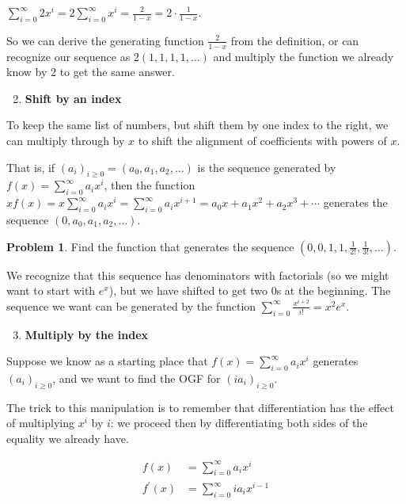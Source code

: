 \documentclass{article}
\theoremstyle{definition}
\newtheorem{problem}{Problem}
\begin{document}
$\sum_{i=0}^{\infty} 2 x^{i}=2 \sum_{i=0}^{\infty} x^{i}=\frac{2}{1-x}=2 \cdot \frac{1}{1-x}$.

So we can derive the generating function $\frac{2}{1-x}$ from the definition, or can recognize our sequence as $2(1,1,1,1, \ldots)$ and multiply the function we already know by 2 to get the same answer.

\begin{enumerate}
\setcounter{enumi}{1}
\item \textbf{Shift by an index}
\end{enumerate}

To keep the same list of numbers, but shift them by one index to the right, we can multiply through by $x$ to shift the alignment of coefficients with powers of $x$.

That is, if $\left(a_{i}\right)_{i \geq 0}=\left(a_{0}, a_{1}, a_{2}, \ldots\right)$ is the sequence generated by $f(x)=\sum_{i=0}^{\infty} a_{i} x^{i}$, then the function $x f(x)=x \sum_{i=0}^{\infty} a_{i} x^{i}=\sum_{i=0}^{\infty} a_{i} x^{i+1}=a_{0} x+a_{1} x^{2}+a_{2} x^{3}+\cdots$ generates the sequence $\left(0, a_{0}, a_{1}, a_{2}, \ldots\right)$.

\begin{problem}
Find the function that generates the sequence $\left(0,0,1,1, \frac{1}{2!}, \frac{1}{3!}, \ldots\right)$.
\end{problem}

We recognize that this sequence has denominators with factorials (so we might want to start with $e^{x}$), but we have shifted to get two 0s at the beginning. The sequence we want can be generated by the function $\sum_{i=0}^{\infty} \frac{x^{i+2}}{i!}=x^{2} e^{x}$.

\begin{enumerate}
\setcounter{enumi}{2}
\item \textbf{Multiply by the index}
\end{enumerate}

Suppose we know as a starting place that $f(x)=\sum_{i=0}^{\infty} a_{i} x^{i}$ generates $\left(a_{i}\right)_{i \geq 0}$, and we want to find the OGF for $\left(i a_{i}\right)_{i \geq 0}$.

The trick to this manipulation is to remember that differentiation has the effect of multiplying $x^{i}$ by $i$: we proceed then by differentiating both sides of the equality we already have.

\begin{align}
f(x) &= \sum_{i=0}^{\infty} a_{i} x^{i} \\
f^{\prime}(x) &= \sum_{i=0}^{\infty} i a_{i} x^{i-1}
\end{align}
\end{document}
